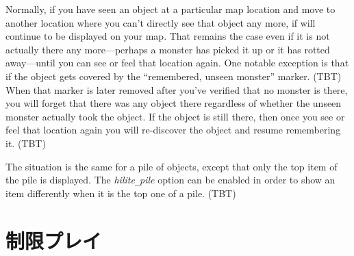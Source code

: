 Normally, if you have seen an object at a particular map location and
move to another location where you can't directly see that object any
more, if will continue to be displayed on your map.
That remains the case even if it is not actually there any
more---perhaps a monster has picked it up or it has rotted
away---until you can see or feel that location again.
One notable exception is that if the object gets covered by the
``remembered, unseen monster'' marker.
(TBT)
When that marker is later removed
after you've verified that no monster is there, you will forget that
there was any object there regardless of whether the unseen monster
actually took the object.
If the object is still there, then once you see or feel that location
again you will re-discover the object and resume remembering it.
(TBT)

The situation is the same for a pile of objects, except that only the
top item of the pile is displayed.
The
{\it hilite\verb+_+pile\/}
option can be enabled in order to show an item differently when it is
the top one of a pile.
(TBT)

\section{制限プレイ}

